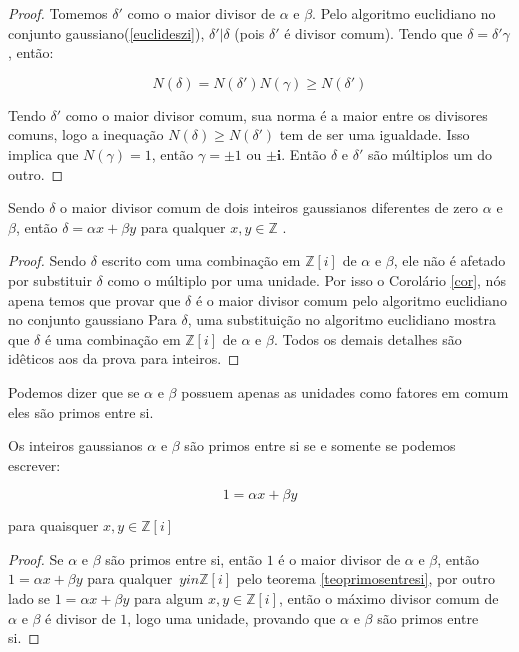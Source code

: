 \begin{proof}
	Tomemos $\delta'$ como o maior divisor de $\alpha$ e $\beta$. Pelo algoritmo euclidiano no conjunto gaussiano(\ref{euclideszi}), $\delta' | \delta$ (pois $\delta'$ \'e divisor comum). Tendo que $\delta = \delta' \gamma$, ent\~ao:

$$N(\delta) = N(\delta')N(\gamma) \geq N(\delta')$$

Tendo $\delta'$ como o maior divisor comum, sua norma \'e a maior entre os divisores comuns, logo a inequa\c{c}\~ao $N(\delta) \geq N(\delta')$ tem de ser uma igualdade. Isso implica que $N(\gamma) = 1$, ent\~ao $\gamma = \pm 1$ ou $\pm \textbf{i}$. Ent\~ao $\delta$ e $\delta'$ s\~ao m\'ultiplos um do outro.

\end{proof}

\begin{Th} \label{teoprimosentresi}
	Sendo $\delta$ o maior divisor comum de dois inteiros gaussianos diferentes de zero $\alpha$ e $\beta$, ent\~ao $\delta = \alpha x + \beta y$ para qualquer $x, y \in \mathbb{Z}$ .
\end{Th}

\begin{proof}
Sendo $\delta$ escrito com uma combina\c{c}\~ao em $\mathbb{Z}[i]$ de $\alpha$ e $\beta$, ele n\~ao \'e afetado por substituir $\delta$ como o m\'ultiplo por uma unidade. Por isso o Corol\'ario \ref{cor}, n\'os apena temos que provar que $\delta$ \'e o maior divisor comum pelo algoritmo euclidiano no conjunto gaussiano Para $\delta$, uma substitui\c{c}\~ao no algoritmo euclidiano mostra que $\delta$ \'e uma combina\c{c}\~ao em $\mathbb{Z}[i]$ de $\alpha$ e $\beta$. Todos os demais detalhes s\~ao id\^eticos aos da prova para inteiros.

\end{proof}

Podemos dizer que se $\alpha$ e $\beta$ possuem apenas as unidades como fatores em comum eles s\~ao primos entre si. 

\begin{Cor} \label{primosentresi}

Os inteiros gaussianos $\alpha$ e $\beta$ s\~ao primos entre si se e somente se podemos escrever:

$$1 = \alpha x + \beta y$$

para quaisquer $x, y \in \mathbb{Z}[i]$

\end{Cor}

\begin{proof}

Se $\alpha$ e $\beta$ s\~ao primos entre si, ent\~ao $1$ \'e o maior divisor de $\alpha$ e $\beta$, ent\~ao $1 = \alpha x + \beta y$ para qualquer $\, y in \mathbb{Z}[i]$  pelo teorema \ref{teoprimosentresi}, por outro lado se $1 = \alpha x + \beta y$ para algum $x, y \in \mathbb{Z}[i]$, ent\~ao o m\'aximo divisor comum de $\alpha$ e $\beta$ \'e divisor de $1$, logo uma unidade, provando que $\alpha$ e $\beta$ s\~ao primos entre si.

\end{proof}


